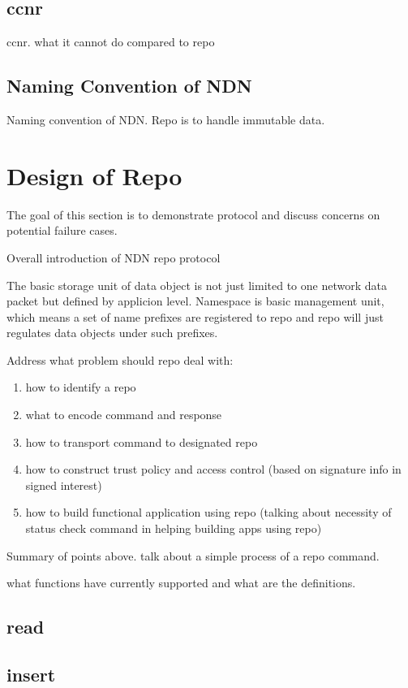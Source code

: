 \documentclass[conference]{IEEEtran}
\begin{document}
\subsection{ccnr}
ccnr. what it cannot do compared to repo

\subsection{Naming Convention of NDN}
Naming convention of NDN. Repo is to handle immutable data.

\section{Design of Repo}
The goal of this section is to demonstrate protocol and discuss concerns on potential failure cases.

Overall introduction of NDN repo protocol

The basic storage unit of data object is not just limited to one network data packet but defined by applicion level. Namespace is basic management unit, which means a set of name prefixes are registered to repo and repo will just regulates data objects under such prefixes.

Address what problem should repo deal with:
\begin{enumerate}
\item how to identify a repo
\item what to encode command and response
\item how to transport command to designated repo
\item how to construct trust policy and access control (based on signature info in signed interest)
\item how to build functional application using repo (talking about necessity of status check command in helping building apps using repo)
\end{enumerate}

Summary of points above. talk about a simple process of a repo command.



what functions have currently supported and what are the definitions.

\subsection{read}

\subsection{insert}
\end{document}
